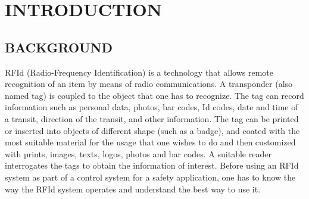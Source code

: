 

\chapter[INTRODUCTION]{\fontsize{16}{12}\selectfont INTRODUCTION}


\section[Background]{\fontsize{14}{12}\selectfont \MakeUppercase{BACKGROUND}}
RFId (Radio-Frequency Identification) is a technology that allows remote recognition of an item by means of radio communications. A transponder (also named tag) is coupled to the object that one has to recognize. The tag can record information such as personal data, photos, bar codes, Id codes, date and time of a transit, direction of the transit, and other information. 
The tag can be printed or inserted into objects of different shape (such as a badge), and coated with the most suitable material for the usage that one wishes to do and then customized with prints, images, texts, logos, photos and bar codes. A suitable reader interrogates the tags to obtain the information of interest. Before using an RFId system as part of a control system for a safety application, one has to know the way the RFId system operates and understand the best way to use it.

